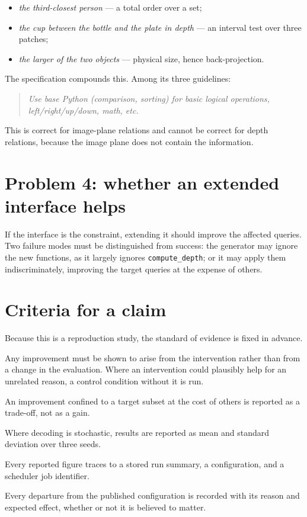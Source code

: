 \documentclass[12pt,a4paper,oneside]{report}
\begin{document}
\begin{itemize}[leftmargin=1.6em, itemsep=2pt]
\item \emph{the third-closest person} --- a total order over a set;
\item \emph{the cup between the bottle and the plate in depth} --- an interval test
over three patches;
\item \emph{the larger of the two objects} --- physical size, hence back-projection.
\end{itemize}

The specification compounds this. Among its three guidelines:

\begin{quote}\itshape
Use base Python (comparison, sorting) for basic logical operations,
left/right/up/down, math, etc.
\end{quote}

This is correct for image-plane relations and cannot be correct for depth relations,
because the image plane does not contain the information.

\section{Problem 4: whether an extended interface helps}

If the interface is the constraint, extending it should improve the affected queries.
Two failure modes must be distinguished from success: the generator may ignore the new
functions, as it largely ignores \texttt{compute\_depth}; or it may apply them
indiscriminately, improving the target queries at the expense of others.

\section{Criteria for a claim}

Because this is a reproduction study, the standard of evidence is fixed in advance.

\begin{description}[leftmargin=2.2em, style=nextline, itemsep=4pt]
\item[C-1 Attribution] Any improvement must be shown to arise from the intervention
rather than from a change in the evaluation. Where an intervention could plausibly help
for an unrelated reason, a control condition without it is run.
\item[C-2 Non-degradation] An improvement confined to a target subset at the cost of
others is reported as a trade-off, not as a gain.
\item[C-3 Stability] Where decoding is stochastic, results are reported as mean and
standard deviation over three seeds.
\item[C-4 Provenance] Every reported figure traces to a stored run summary, a
configuration, and a scheduler job identifier.
\item[C-5 Disclosure] Every departure from the published configuration is recorded with
its reason and expected effect, whether or not it is believed to matter.
\end{description}
\end{document}
